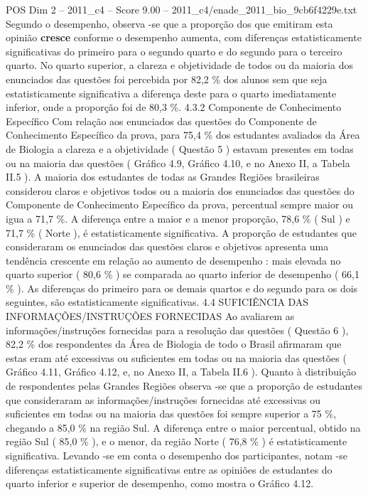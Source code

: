 \begin{textsample}{POS Dim 2 – 2011\_c4 – Score 9.00 – 2011\_c4/enade\_2011\_bio\_9cb6f4229e.txt}
Segundo o desempenho, observa -se que a proporção dos que emitiram esta opinião \textbf{cresce} conforme o desempenho aumenta, com diferenças estatisticamente significativas do primeiro para o segundo quarto e do segundo para o terceiro quarto.
No quarto superior, a clareza e objetividade de todos ou da maioria dos enunciados das questões foi percebida por 82,2 \% dos alunos sem que seja estatisticamente significativa a diferença deste para o quarto imediatamente inferior, onde a proporção foi de 80,3 \%. 4.3.2 Componente de Conhecimento Específico Com relação aos enunciados das questões do Componente de Conhecimento Específico da prova, para 75,4 \% dos estudantes avaliados da Área de Biologia a clareza e a objetividade ( Questão 5 ) estavam presentes em todas ou na maioria das questões ( Gráfico 4.9, Gráfico 4.10, e no Anexo II, a Tabela II.5 ).
A maioria dos estudantes de todas as Grandes Regiões brasileiras considerou claros e objetivos todos ou a maioria dos enunciados das questões do Componente de Conhecimento Específico da prova, percentual sempre maior ou igua a 71,7 \%.
A diferença entre a maior e a menor proporção, 78,6 \% ( Sul ) e 71,7 \% ( Norte ), é estatisticamente significativa.
A proporção de estudantes que consideraram os enunciados das questões claros e objetivos apresenta uma tendência crescente em relação ao aumento de desempenho : mais elevada no quarto superior ( 80,6 \% ) se comparada ao quarto inferior de desempenho ( 66,1 \% ).
As diferenças do primeiro para os demais quartos e do segundo para os dois seguintes, são estatisticamente significativas. 4.4 SUFICIÊNCIA DAS INFORMAÇÕES/INSTRUÇÕES FORNECIDAS Ao avaliarem as informações/instruções fornecidas para a resolução das questões ( Questão 6 ), 82,2 \% dos respondentes da Área de Biologia de todo o Brasil afirmaram que estas eram até excessivas ou suficientes em todas ou na maioria das questões ( Gráfico 4.11, Gráfico 4.12, e, no Anexo II, a Tabela II.6 ).
Quanto à distribuição de respondentes pelas Grandes Regiões observa -se que a proporção de estudantes que consideraram as informações/instruções fornecidas até excessivas ou suficientes em todas ou na maioria das questões foi sempre superior a 75 \%, chegando a 85,0 \% na região Sul.
A diferença entre o maior percentual, obtido na região Sul ( 85,0 \% ), e o menor, da região Norte ( 76,8 \% ) é estatisticamente significativa.
Levando -se em conta o desempenho dos participantes, notam -se diferenças estatisticamente significativas entre as opiniões de estudantes do quarto inferior e superior de desempenho, como mostra o Gráfico 4.12.

\end{textsample}
